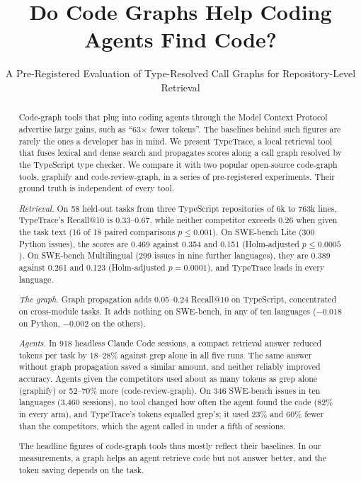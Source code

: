 \documentclass[sigconf,nonacm]{acmart}
\newcommand{\tool}{TypeTrace\xspace}
\newcommand{\gfy}{graphify\xspace}
\newcommand{\crg}{code-review-graph\xspace}
\begin{document}
\title{Do Code Graphs Help Coding Agents Find Code?}
\subtitle{A Pre-Registered Evaluation of Type-Resolved Call Graphs for Repository-Level Retrieval}



\begin{abstract}
Code-graph tools that plug into coding agents through the Model Context Protocol advertise large gains, such as ``63$\times$ fewer tokens''. The baselines behind such figures are rarely the ones a developer has in mind. We present \tool, a local retrieval tool that fuses lexical and dense search and propagates scores along a call graph resolved by the TypeScript type checker. We compare it with two popular open-source code-graph tools, \gfy and \crg, in a series of pre-registered experiments. Their ground truth is independent of every tool.

\emph{Retrieval.} On 58 held-out tasks from three TypeScript repositories of 6k to 763k lines, \tool's Recall@10 is 0.33--0.67, while neither competitor exceeds 0.26 when given the task text (16 of 18 paired comparisons $p \le 0.001$). On SWE-bench Lite (300 Python issues), the scores are 0.469 against 0.354 and 0.151 (Holm-adjusted $p \le 0.0005$). On SWE-bench Multilingual (299 issues in nine further languages), they are 0.389 against 0.261 and 0.123 (Holm-adjusted $p = 0.0001$), and \tool leads in every language.

\emph{The graph.} Graph propagation adds 0.05--0.24 Recall@10 on TypeScript, concentrated on cross-module tasks. It adds nothing on SWE-bench, in any of ten languages ($-0.018$ on Python, $-0.002$ on the others).

\emph{Agents.} In 918 headless Claude Code sessions, a compact retrieval answer reduced tokens per task by 18--28\% against grep alone in all five runs. The same answer without graph propagation saved a similar amount, and neither reliably improved accuracy. Agents given the competitors used about as many tokens as grep alone (\gfy) or 52--70\% more (\crg). On 346 SWE-bench issues in ten languages (3,460 sessions), no tool changed how often the agent found the code (82\% in every arm), and \tool's tokens equalled grep's; it used 23\% and 60\% fewer than the competitors, which the agent called in under a fifth of sessions.

The headline figures of code-graph tools thus mostly reflect their baselines. In our measurements, a graph helps an agent retrieve code but not answer better, and the token saving depends on the task.
\end{abstract}
\end{document}
